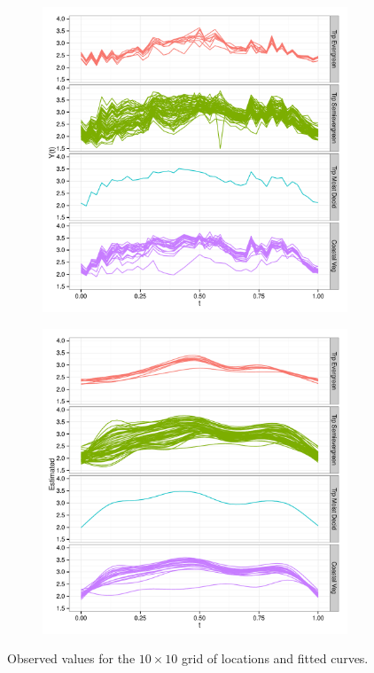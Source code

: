 \begin{figure}
        \centering 
        \begin{subfigure}[b]{0.5\textwidth}
                \centering
                \includegraphics[width=\textwidth]{Images-future-work/region6-curves-facet.pdf}
        \end{subfigure}%
        \begin{subfigure}[b]{0.5\textwidth}
                \centering
                \includegraphics[width=\textwidth]{Images-future-work/region6-estimated-curves-facet.pdf}
        \end{subfigure}
        \caption{Observed values for the $10\times 10$ grid of locations and fitted curves.}
        \label{fig:estimated curves}
\end{figure}

